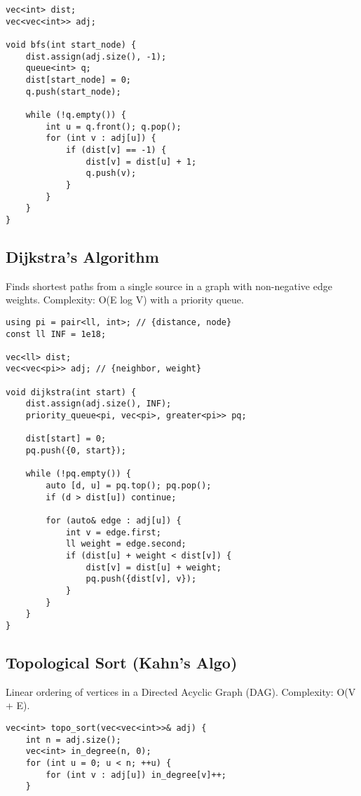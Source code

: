 \documentclass[10pt]{article}
\begin{document}
\begin{multicols}{2}
\begin{lstlisting}
vec<int> dist;
vec<vec<int>> adj;

void bfs(int start_node) {
    dist.assign(adj.size(), -1);
    queue<int> q;
    dist[start_node] = 0;
    q.push(start_node);

    while (!q.empty()) {
        int u = q.front(); q.pop();
        for (int v : adj[u]) {
            if (dist[v] == -1) {
                dist[v] = dist[u] + 1;
                q.push(v);
            }
        }
    }
}
\end{lstlisting}

\subsection{Dijkstra's Algorithm}
Finds shortest paths from a single source in a graph with non-negative edge weights. Complexity: O(E log V) with a priority queue.

\begin{lstlisting}
using pi = pair<ll, int>; // {distance, node}
const ll INF = 1e18;

vec<ll> dist;
vec<vec<pi>> adj; // {neighbor, weight}

void dijkstra(int start) {
    dist.assign(adj.size(), INF);
    priority_queue<pi, vec<pi>, greater<pi>> pq;

    dist[start] = 0;
    pq.push({0, start});

    while (!pq.empty()) {
        auto [d, u] = pq.top(); pq.pop();
        if (d > dist[u]) continue;

        for (auto& edge : adj[u]) {
            int v = edge.first;
            ll weight = edge.second;
            if (dist[u] + weight < dist[v]) {
                dist[v] = dist[u] + weight;
                pq.push({dist[v], v});
            }
        }
    }
}
\end{lstlisting}

\subsection{Topological Sort (Kahn's Algo)}
Linear ordering of vertices in a Directed Acyclic Graph (DAG). Complexity: O(V + E).

\begin{lstlisting}
vec<int> topo_sort(vec<vec<int>>& adj) {
    int n = adj.size();
    vec<int> in_degree(n, 0);
    for (int u = 0; u < n; ++u) {
        for (int v : adj[u]) in_degree[v]++;
    }


\end{lstlisting}
\end{multicols}
\end{document}
